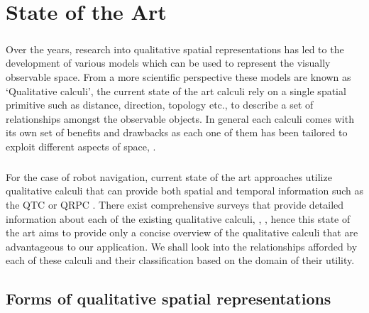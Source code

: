 
\chapter{State of the Art}
\paragraph{}Over the years, research into qualitative spatial representations has led to the development of various models which can be used to represent the visually observable space. From a more scientific perspective these models are known as `Qualitative calculi', the current state of the art calculi rely on a single spatial primitive such as distance, direction, topology etc., to describe a set of relationships amongst the observable objects. In general each calculi comes with its own set of benefits and drawbacks as each one of them has been tailored to exploit different aspects of space\cite{chen2015survey}, \cite{cohn2008qualitative}. 

\paragraph{}For the case of robot navigation, current state of the art approaches utilize qualitative calculi that can provide both spatial and temporal information such as the QTC \cite{van2005qualitative} or QRPC \cite{glez2013qrpc}. There exist comprehensive surveys that provide detailed information about each of the existing qualitative calculi\cite{cohn1997qualitative}, \cite{chen2015survey}, \cite{cohn2001qualitative}, \cite{cohn2008qualitative} hence this state of the art aims to provide only a concise overview of the qualitative calculi that are advantageous to our application. We shall look into the relationships afforded by each of these calculi and their classification based on the domain of their utility.

 
\section{Forms of qualitative spatial representations}
		
